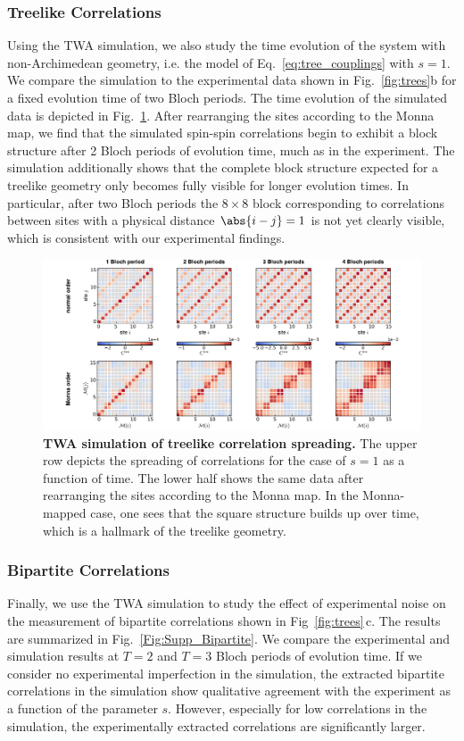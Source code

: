 \begin{bibunit}
\subsubsection{Treelike Correlations}
Using the TWA simulation, we also study the time evolution of the system with non-Archimedean geometry, i.e. the model of Eq.~\eqref{eq:tree_couplings} with $s = 1$.  We compare the simulation to the experimental data shown in Fig.~\ref{fig:trees}b for a fixed evolution time of two Bloch periods. The time evolution of the simulated data is depicted in Fig.~\ref{Fig:Supp_Tree}. After rearranging the sites according to the Monna map, we find that the simulated spin-spin correlations begin to exhibit a block structure after 2 Bloch periods of evolution time, much as in the experiment. The simulation additionally shows that the complete block structure expected for a treelike geometry only becomes fully visible for longer evolution times. In particular, after two Bloch periods the $8\times 8$ block corresponding to correlations between sites with a physical distance $\abs{i-j}=1$ is not yet clearly visible, which is consistent with our experimental findings.
\begin{figure}
    \centering
    \includegraphics[width=\textwidth]{Figures/Supplement2.pdf}
    \caption{\textbf{TWA simulation of treelike correlation spreading.} The upper row depicts the spreading of correlations for the case of $s =1 $ as a function of time. The lower half shows the same data after rearranging the sites according to the Monna map. In the Monna-mapped case, one sees that the square structure builds up over time, which is a hallmark of the treelike geometry.}
    \label{Fig:Supp_Tree}
\end{figure}

\subsubsection{Bipartite Correlations}
Finally, we use the TWA simulation to study the effect of experimental noise on the measurement of bipartite correlations shown in Fig~\ref{fig:trees}\,c. The results are summarized in Fig.~\ref{Fig:Supp_Bipartite}. We compare the experimental and simulation results at $T=2$ and $T=3$ Bloch periods of evolution time. If we consider no experimental imperfection in the simulation, the extracted bipartite correlations in the simulation show qualitative agreement with the experiment as a function of the parameter $s$. However, especially for low correlations in the simulation, the experimentally extracted correlations are significantly larger.


\end{bibunit}
